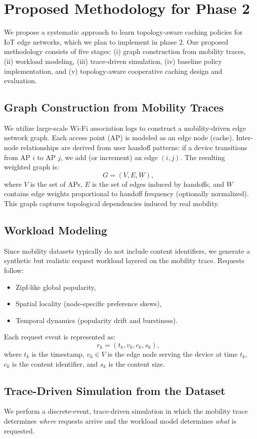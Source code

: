\section{Proposed Methodology for Phase 2}

We propose a systematic approach to learn topology-aware caching policies for IoT edge networks, which we plan to implement in phase 2.
Our proposed methodology consists of five stages: (i) graph construction from mobility traces, (ii) workload modeling, (iii) trace-driven simulation, (iv) baseline policy implementation, and (v) topology-aware cooperative caching design and evaluation.

\subsection{Graph Construction from Mobility Traces}
We utilize large-scale Wi-Fi association logs to construct a mobility-driven edge network graph. Each access point (AP) is modeled as an edge node (cache). Inter-node relationships are derived from user handoff patterns: if a device transitions from AP $i$ to AP $j$, we add (or increment) an edge $(i,j)$. The resulting weighted graph is:
\[
G = (V, E, W),
\]
where $V$ is the set of APs, $E$ is the set of edges induced by handoffs, and $W$ contains edge weights proportional to handoff frequency (optionally normalized). This graph captures topological dependencies induced by real mobility.

\subsection{Workload Modeling}
Since mobility datasets typically do not include content identifiers, we generate a synthetic but realistic request workload layered on the mobility trace. Requests follow:
\begin{itemize}
    \item Zipf-like global popularity,
    \item Spatial locality (node-specific preference skews),
    \item Temporal dynamics (popularity drift and burstiness).
\end{itemize}
Each request event is represented as:
\[
r_k = (t_k, v_k, c_k, s_k),
\]
where $t_k$ is the timestamp, $v_k \in V$ is the edge node serving the device at time $t_k$, $c_k$ is the content identifier, and $s_k$ is the content size.

\subsection{Trace-Driven Simulation from the Dataset}
We perform a discrete-event, trace-driven simulation in which the mobility trace determines \emph{where} requests arrive and the workload model determines \emph{what} is requested.

